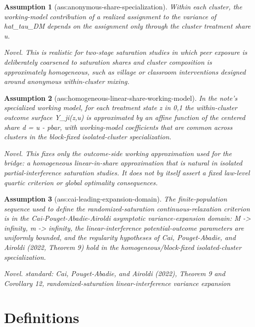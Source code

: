 \documentclass{article}
\newtheorem{assumption}{Assumption}
\begin{document}
\begin{assumption}[ass:anonymous-share-specialization]\label{ass:anonymous-share-specialization}
Within each cluster, the working-model contribution of a realized assignment to the variance of hat_tau_DM depends on the assignment only through the cluster treatment share u.
\par\smallskip\noindent\emph{Novel.} This is realistic for two-stage saturation studies in which peer exposure is deliberately coarsened to saturation shares and cluster composition is approximately homogeneous, such as village or classroom interventions designed around anonymous within-cluster mixing.
\end{assumption}

\begin{assumption}[ass:homogeneous-linear-share-working-model]\label{ass:homogeneous-linear-share-working-model}
In the note's specialized working model, for each treatment state z in {0,1} the within-cluster outcome surface Y_{ji}(z,u) is approximated by an affine function of the centered share d = u - pbar, with working-model coefficients that are common across clusters in the block-fixed isolated-cluster specialization.
\par\smallskip\noindent\emph{Novel.} This fixes only the outcome-side working approximation used for the bridge: a homogeneous linear-in-share approximation that is natural in isolated partial-interference saturation studies. It does not by itself assert a fixed law-level quartic criterion or global optimality consequences.
\end{assumption}

\begin{assumption}[ass:cai-leading-expansion-domain]\label{ass:cai-leading-expansion-domain}
The finite-population sequence used to define the randomized-saturation continuous-relaxation criterion is in the Cai-Pouget-Abadie-Airoldi asymptotic variance-expansion domain: M -> infinity, m -> infinity, the linear-interference potential-outcome parameters are uniformly bounded, and the regularity hypotheses of Cai, Pouget-Abadie, and Airoldi (2022, Theorem 9) hold in the homogeneous/block-fixed isolated-cluster specialization.
\par\smallskip\noindent\emph{Novel.} standard: Cai, Pouget-Abadie, and Airoldi (2022), Theorem 9 and Corollary 12, randomized-saturation linear-interference variance expansion
\end{assumption}

\section{Definitions}
\end{document}
